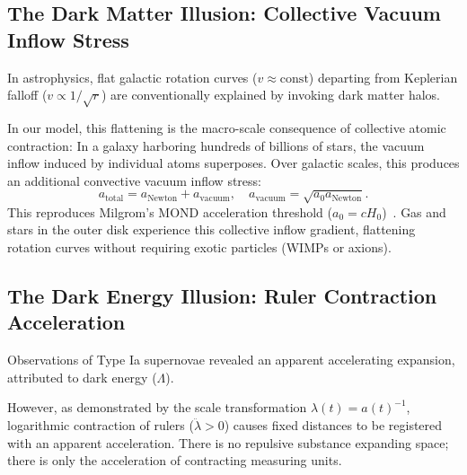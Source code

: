 \subsection{The Dark Matter Illusion: Collective Vacuum Inflow Stress}
In astrophysics, flat galactic rotation curves ($v \approx \text{const}$) departing from Keplerian falloff ($v \propto 1/\sqrt{r}$) are conventionally explained by invoking dark matter halos.

In our model, this flattening is the macro-scale consequence of collective atomic contraction:
In a galaxy harboring hundreds of billions of stars, the vacuum inflow induced by individual atoms superposes. Over galactic scales, this produces an additional convective vacuum inflow stress:
\begin{equation}
    a_{\mathrm{total}} = a_{\mathrm{Newton}} + a_{\mathrm{vacuum}}, \quad a_{\mathrm{vacuum}} = \sqrt{a_0 a_{\mathrm{Newton}}}.
    \label{eq:karanlik_madde_mond}
\end{equation}
This reproduces Milgrom's MOND acceleration threshold ($a_0 = c H_0$)~\cite{milgrom1983}. Gas and stars in the outer disk experience this collective inflow gradient, flattening rotation curves without requiring exotic particles (WIMPs or axions).

\subsection{The Dark Energy Illusion: Ruler Contraction Acceleration}
Observations of Type Ia supernovae revealed an apparent accelerating expansion, attributed to dark energy ($\Lambda$).

However, as demonstrated by the scale transformation $\lambda(t) = a(t)^{-1}$, logarithmic contraction of rulers ($\ddot{\lambda} > 0$) causes fixed distances to be registered with an apparent acceleration. There is no repulsive substance expanding space; there is only the acceleration of contracting measuring units.

